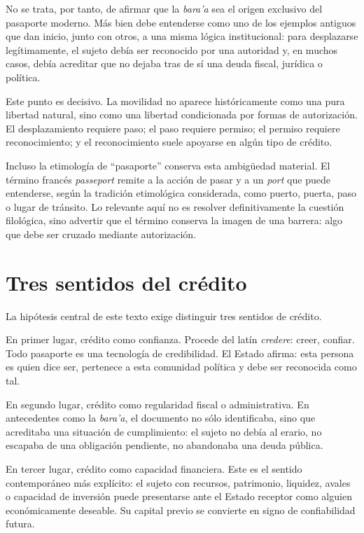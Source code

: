 \documentclass[12pt,a4paper]{article}
\begin{document}
No se trata, por tanto, de afirmar que la \textit{bara'a} sea el origen exclusivo del pasaporte moderno. Más bien debe entenderse como uno de los ejemplos antiguos que dan inicio, junto con otros, a una misma lógica institucional: para desplazarse legítimamente, el sujeto debía ser reconocido por una autoridad y, en muchos casos, debía acreditar que no dejaba tras de sí una deuda fiscal, jurídica o política.

Este punto es decisivo. La movilidad no aparece históricamente como una pura libertad natural, sino como una libertad condicionada por formas de autorización. El desplazamiento requiere paso; el paso requiere permiso; el permiso requiere reconocimiento; y el reconocimiento suele apoyarse en algún tipo de crédito.

Incluso la etimología de ``pasaporte'' conserva esta ambigüedad material. El término francés \textit{passeport} remite a la acción de pasar y a un \textit{port} que puede entenderse, según la tradición etimológica considerada, como puerto, puerta, paso o lugar de tránsito. Lo relevante aquí no es resolver definitivamente la cuestión filológica, sino advertir que el término conserva la imagen de una barrera: algo que debe ser cruzado mediante autorización.

\section*{Tres sentidos del crédito}

La hipótesis central de este texto exige distinguir tres sentidos de crédito.

En primer lugar, crédito como confianza. Procede del latín \textit{credere}: creer, confiar. Todo pasaporte es una tecnología de credibilidad. El Estado afirma: esta persona es quien dice ser, pertenece a esta comunidad política y debe ser reconocida como tal.

En segundo lugar, crédito como regularidad fiscal o administrativa. En antecedentes como la \textit{bara'a}, el documento no sólo identificaba, sino que acreditaba una situación de cumplimiento: el sujeto no debía al erario, no escapaba de una obligación pendiente, no abandonaba una deuda pública.

En tercer lugar, crédito como capacidad financiera. Este es el sentido contemporáneo más explícito: el sujeto con recursos, patrimonio, liquidez, avales o capacidad de inversión puede presentarse ante el Estado receptor como alguien económicamente deseable. Su capital previo se convierte en signo de confiabilidad futura.
\end{document}
